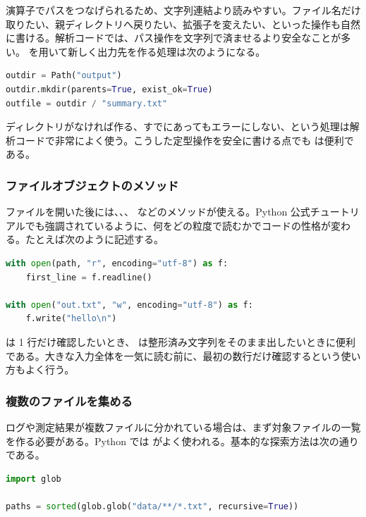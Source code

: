 \code{/} 演算子でパスをつなげられるため、文字列連結より読みやすい。ファイル名だけ取りたい、親ディレクトリへ戻りたい、拡張子を変えたい、といった操作も自然に書ける。解析コードでは、パス操作を文字列で済ませるより安全なことが多い。 を用いて新しく出力先を作る処理は次のようになる。

\begin{lstlisting}[language=Python]
outdir = Path("output")
outdir.mkdir(parents=True, exist_ok=True)
outfile = outdir / "summary.txt"
\end{lstlisting}

ディレクトリがなければ作る、すでにあってもエラーにしない、という処理は解析コードで非常によく使う。こうした定型操作を安全に書ける点でも  は便利である。

\subsubsection{ファイルオブジェクトのメソッド}

ファイルを開いた後には、、、 などのメソッドが使える。Python 公式チュートリアルでも強調されているように、何をどの粒度で読むかでコードの性格が変わる。たとえば次のように記述する。

\begin{lstlisting}[language=Python]
with open(path, "r", encoding="utf-8") as f:
    first_line = f.readline()

with open("out.txt", "w", encoding="utf-8") as f:
    f.write("hello\n")
\end{lstlisting}

 は 1 行だけ確認したいとき、 は整形済み文字列をそのまま出したいときに便利である。大きな入力全体を一気に読む前に、最初の数行だけ確認するという使い方もよく行う。

\subsubsection{複数のファイルを集める}

ログや測定結果が複数ファイルに分かれている場合は、まず対象ファイルの一覧を作る必要がある。Python では  がよく使われる。基本的な探索方法は次の通りである。

\begin{lstlisting}[language=Python]
import glob

paths = sorted(glob.glob("data/**/*.txt", recursive=True))
\end{lstlisting}

